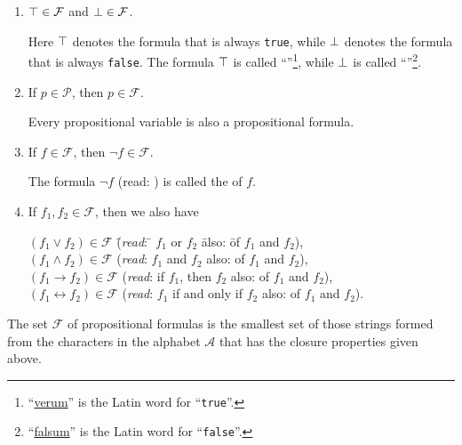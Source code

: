 \begin{enumerate}
\item $\top \in \mathcal{F}$ and $\bot \in \mathcal{F}$.

      Here $\top$   denotes the formula that is always \texttt{true}, while $\bot$
        denotes the formula that is always \texttt{false}.
      The formula $\top$ is called
      ``''\footnote{``\href{https://translate.google.com/?sl=la&tl=en&text=falsum&op=translate&hl=en}{verum}''
        is the Latin word for ``\texttt{true}''.},  while $\bot$ is called 
      ``''\footnote{``\href{https://translate.google.com/?sl=la&tl=en&text=falsum&op=translate&hl=en}{falsum}''
        is the Latin word for ``\texttt{false}''.}.  
\item If $p \in \mathcal{P}$, then  $p \in \mathcal{F}$.

      Every propositional variable is also a propositional formula.
\item If $f \in \mathcal{F}$, then  $\neg f \in \mathcal{F}$.

      The formula  $\neg f$  (read: ) is called the  of $f$.
\item If $f_1, f_2 \in \mathcal{F}$, then we also have
      \begin{tabbing}
        $(f_1 \vee f_2) \in \mathcal{F}$  \hspace*{0.5cm} \= (\textsl{read}: \quad \= $f_1$ or $f_2$ \hspace*{2.3cm} \=
         also: \qquad\= of $f_1$ and $f_2$), \\
        $(f_1 \wedge f_2) \in \mathcal{F}$  \> (\textsl{read}: \> $f_1$ and $f_2$ \>
         also: \> of $f_1$ and $f_2$), \\
        $(f_1 \rightarrow f_2) \in \mathcal{F}$  \> (\textsl{read}:       \> if $f_1$, then $f_2$ \>
         also: \> of $f_1$ and $f_2$), \\
        $(f_1 \leftrightarrow f_2) \in \mathcal{F}$  \>
        (\textsl{read}:       \> $f_1$ if and only if $f_2$ \>
        also: \> of $f_1$ and $f_2$).            
      \end{tabbing}
\end{enumerate}
The set  $\mathcal{F}$ of propositional formulas is the smallest set of those strings formed from the characters
in the alphabet $\mathcal{A}$ that has the closure properties given above.

